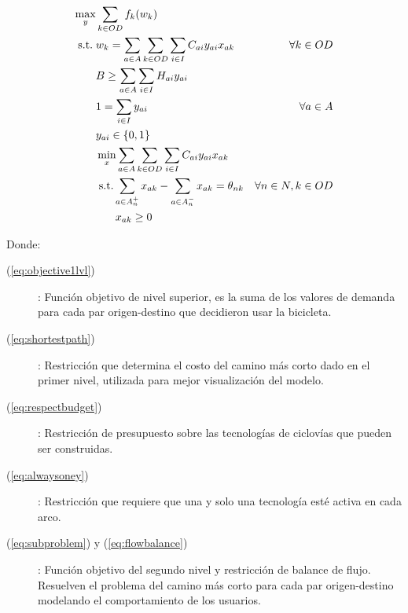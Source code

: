 \begin{align}
  \max_{y}       & \sum_{k \in OD} f_k(w_k)                                                         & \label{eq:objective1lvl} \\
  \text{s.t.}\;  & w_k = \sum_{a \in A} \sum_{k \in OD} \sum_{i \in I} C_{ai}y_{ai}x_{ak}           & \forall k \in OD \label{eq:shortestpath} \\
                 & B \geq \sum_{a \in A} \sum_{i \in I} H_{ai}y_{ai}                                & \label{eq:respectbudget} \\
                 & 1 = \sum_{i \in I} y_{ai}                                                        & \forall a \in A \label{eq:alwaysoney} \\
                 & y_{ai} \in \{0,1\}                                                   & \nonumber \\
                 & \min_{x} \sum_{a \in A} \sum_{k \in OD} \sum_{i \in I} C_{ai}y_{ai}x_{ak}      & \label{eq:subproblem} \\
                 & \;\text{s.t.} \sum_{a \in A_n^+} x_{ak} - \sum_{a \in A_n^-} x_{ak} = \theta_{nk}  & \forall n \in N, k \in OD \label{eq:flowbalance} \\
                 & \;\hspace{1.5em} x_{ak} \geq 0                                                        & \nonumber
\end{align}

Donde:

\begin{description}
  \item[(\ref{eq:objective1lvl})]: Función objetivo de nivel superior, es la suma de los valores de demanda para cada par origen-destino que decidieron usar la bicicleta.
  \item[(\ref{eq:shortestpath})]: Restricción que determina el costo del camino más corto dado en el primer nivel, utilizada para mejor visualización del modelo.
  \item[(\ref{eq:respectbudget})]: Restricción de presupuesto sobre las tecnologías de ciclovías que pueden ser construidas.
  \item[(\ref{eq:alwaysoney})]: Restricción que requiere que una y solo una tecnología esté activa en cada arco.
  \item[(\ref{eq:subproblem}) y (\ref{eq:flowbalance})]: Función objetivo del segundo nivel y restricción de balance de flujo. Resuelven el problema del camino más corto para cada par origen-destino modelando el comportamiento de los usuarios.
\end{description}

